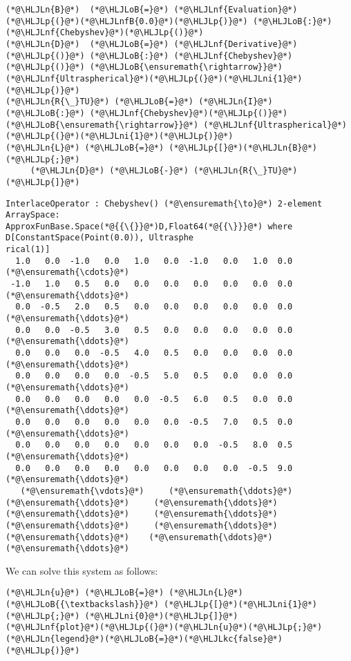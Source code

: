 \documentclass[12pt,a4paper]{article}
\newcommand{\HLJLkc}[1]{\textcolor[RGB]{59,151,46}{\textit{#1}}}
\newcommand{\HLJLn}[1]{#1}
\newcommand{\HLJLnf}[1]{\textcolor[RGB]{66,102,213}{#1}}
\newcommand{\HLJLnfB}[1]{\textcolor[RGB]{59,151,46}{#1}}
\newcommand{\HLJLni}[1]{\textcolor[RGB]{59,151,46}{#1}}
\newcommand{\HLJLoB}[1]{\textcolor[RGB]{102,102,102}{\textbf{#1}}}
\newcommand{\HLJLp}[1]{#1}
\begin{document}
\begin{lstlisting}
(*@\HLJLn{B}@*)  (*@\HLJLoB{=}@*) (*@\HLJLnf{Evaluation}@*)(*@\HLJLp{(}@*)(*@\HLJLnfB{0.0}@*)(*@\HLJLp{)}@*) (*@\HLJLoB{:}@*) (*@\HLJLnf{Chebyshev}@*)(*@\HLJLp{()}@*)
(*@\HLJLn{D}@*)  (*@\HLJLoB{=}@*) (*@\HLJLnf{Derivative}@*)(*@\HLJLp{()}@*) (*@\HLJLoB{:}@*) (*@\HLJLnf{Chebyshev}@*)(*@\HLJLp{()}@*) (*@\HLJLoB{\ensuremath{\rightarrow}}@*) (*@\HLJLnf{Ultraspherical}@*)(*@\HLJLp{(}@*)(*@\HLJLni{1}@*)(*@\HLJLp{)}@*)
(*@\HLJLn{R{\_}TU}@*) (*@\HLJLoB{=}@*) (*@\HLJLn{I}@*) (*@\HLJLoB{:}@*) (*@\HLJLnf{Chebyshev}@*)(*@\HLJLp{()}@*) (*@\HLJLoB{\ensuremath{\rightarrow}}@*) (*@\HLJLnf{Ultraspherical}@*)(*@\HLJLp{(}@*)(*@\HLJLni{1}@*)(*@\HLJLp{)}@*)
(*@\HLJLn{L}@*) (*@\HLJLoB{=}@*) (*@\HLJLp{[}@*)(*@\HLJLn{B}@*)(*@\HLJLp{;}@*)
     (*@\HLJLn{D}@*) (*@\HLJLoB{-}@*) (*@\HLJLn{R{\_}TU}@*)(*@\HLJLp{]}@*)
\end{lstlisting}

\begin{lstlisting}
InterlaceOperator : Chebyshev() (*@\ensuremath{\to}@*) 2-element ArraySpace:
ApproxFunBase.Space(*@{{\{}}@*)D,Float64(*@{{\}}}@*) where D[ConstantSpace(Point(0.0)), Ultrasphe
rical(1)]
  1.0   0.0  -1.0   0.0   1.0   0.0  -1.0   0.0   1.0  0.0  (*@\ensuremath{\cdots}@*)
 -1.0   1.0   0.5   0.0   0.0   0.0   0.0   0.0   0.0  0.0  (*@\ensuremath{\ddots}@*)
  0.0  -0.5   2.0   0.5   0.0   0.0   0.0   0.0   0.0  0.0  (*@\ensuremath{\ddots}@*)
  0.0   0.0  -0.5   3.0   0.5   0.0   0.0   0.0   0.0  0.0  (*@\ensuremath{\ddots}@*)
  0.0   0.0   0.0  -0.5   4.0   0.5   0.0   0.0   0.0  0.0  (*@\ensuremath{\ddots}@*)
  0.0   0.0   0.0   0.0  -0.5   5.0   0.5   0.0   0.0  0.0  (*@\ensuremath{\ddots}@*)
  0.0   0.0   0.0   0.0   0.0  -0.5   6.0   0.5   0.0  0.0  (*@\ensuremath{\ddots}@*)
  0.0   0.0   0.0   0.0   0.0   0.0  -0.5   7.0   0.5  0.0  (*@\ensuremath{\ddots}@*)
  0.0   0.0   0.0   0.0   0.0   0.0   0.0  -0.5   8.0  0.5  (*@\ensuremath{\ddots}@*)
  0.0   0.0   0.0   0.0   0.0   0.0   0.0   0.0  -0.5  9.0  (*@\ensuremath{\ddots}@*)
   (*@\ensuremath{\vdots}@*)     (*@\ensuremath{\ddots}@*)     (*@\ensuremath{\ddots}@*)     (*@\ensuremath{\ddots}@*)     (*@\ensuremath{\ddots}@*)     (*@\ensuremath{\ddots}@*)     (*@\ensuremath{\ddots}@*)     (*@\ensuremath{\ddots}@*)     (*@\ensuremath{\ddots}@*)    (*@\ensuremath{\ddots}@*)   (*@\ensuremath{\ddots}@*)
\end{lstlisting}


We can solve this system as follows:


\begin{lstlisting}
(*@\HLJLn{u}@*) (*@\HLJLoB{=}@*) (*@\HLJLn{L}@*) (*@\HLJLoB{{\textbackslash}}@*) (*@\HLJLp{[}@*)(*@\HLJLni{1}@*)(*@\HLJLp{;}@*) (*@\HLJLni{0}@*)(*@\HLJLp{]}@*)
(*@\HLJLnf{plot}@*)(*@\HLJLp{(}@*)(*@\HLJLn{u}@*)(*@\HLJLp{;}@*)(*@\HLJLn{legend}@*)(*@\HLJLoB{=}@*)(*@\HLJLkc{false}@*)(*@\HLJLp{)}@*)
\end{lstlisting}
\end{document}
